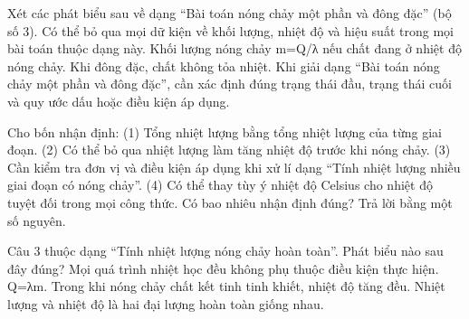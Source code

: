 \begin{ex}
Xét các phát biểu sau về dạng “Bài toán nóng chảy một phần và đông đặc” (bộ số 3).
\choiceTF
{Có thể bỏ qua mọi dữ kiện về khối lượng, nhiệt độ và hiệu suất trong mọi bài toán thuộc dạng này.}
{\True Khối lượng nóng chảy m=Q/λ nếu chất đang ở nhiệt độ nóng chảy.}
{Khi đông đặc, chất không tỏa nhiệt.}
{\True Khi giải dạng “Bài toán nóng chảy một phần và đông đặc”, cần xác định đúng trạng thái đầu, trạng thái cuối và quy ước dấu hoặc điều kiện áp dụng.}
\end{ex}

\begin{ex}
Cho bốn nhận định: (1) Tổng nhiệt lượng bằng tổng nhiệt lượng của từng giai đoạn. (2) Có thể bỏ qua nhiệt lượng làm tăng nhiệt độ trước khi nóng chảy. (3) Cần kiểm tra đơn vị và điều kiện áp dụng khi xử lí dạng “Tính nhiệt lượng nhiều giai đoạn có nóng chảy”. (4) Có thể thay tùy ý nhiệt độ Celsius cho nhiệt độ tuyệt đối trong mọi công thức. Có bao nhiêu nhận định đúng? Trả lời bằng một số nguyên.
\end{ex}

\begin{ex}
Câu 3 thuộc dạng “Tính nhiệt lượng nóng chảy hoàn toàn”. Phát biểu nào sau đây đúng?
\choice
{Mọi quá trình nhiệt học đều không phụ thuộc điều kiện thực hiện.}
{\True Q=λm.}
{Trong khi nóng chảy chất kết tinh tinh khiết, nhiệt độ tăng đều.}
{Nhiệt lượng và nhiệt độ là hai đại lượng hoàn toàn giống nhau.}
\end{ex}

